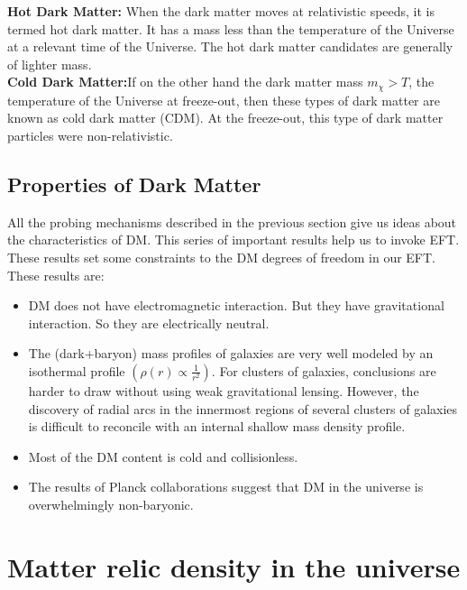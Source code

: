 \documentclass[12pt]{report}
\begin{document}
\textbf{Hot Dark Matter:} When the dark matter moves at relativistic speeds, it is termed hot dark matter. It has a mass less than the temperature of the Universe at a relevant time of the Universe. The hot dark matter candidates are generally of lighter mass.\\

\textbf{Cold Dark Matter:}If on the other hand the dark matter mass $m_\chi > T$, the temperature of the Universe at freeze-out, then these types of dark matter are known as cold dark matter (CDM). At the freeze-out, this type of dark matter particles were non-relativistic.


\section{Properties of Dark Matter}
All the probing mechanisms described in the previous section give us ideas about the characteristics of DM. This series of important results help us to invoke EFT. These results set some constraints to the DM degrees of freedom in our EFT. These results are:

\begin{itemize}
\item DM does not have electromagnetic interaction. But they have gravitational interaction. So they are electrically neutral.

\item The (dark+baryon) mass profiles of galaxies are very well modeled by
an isothermal profile $(\rho(r)\propto \frac{1}{r^2} )$. For clusters of galaxies, conclusions
are harder to draw without using weak gravitational lensing. However,
the discovery of radial arcs in the innermost regions of several clusters
of galaxies is difficult to reconcile with an internal shallow mass density
profile.

\item Most of the DM content is cold and collisionless.
\item The results of Planck collaborations suggest that DM in the universe is overwhelmingly non-baryonic. \cite{plcol}
\end{itemize}

\newpage

\chapter{ Matter relic density in the universe}
\end{document}

